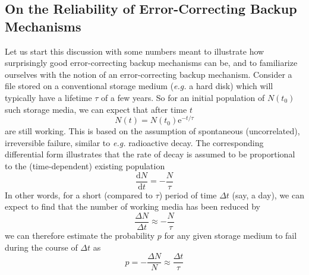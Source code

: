 \documentclass[11pt]{article}
\begin{document}
\begin{mainmatter}
\subsection{On the Reliability of Error-Correcting Backup Mechanisms}

Let us start this discussion with some numbers meant to illustrate how surprisingly good error-correcting backup mechanisms can be, and to familiarize ourselves with the notion of an error-correcting backup mechanism. Consider a file stored on a conventional storage medium (\emph{e.g.} a hard disk) which will typically have a lifetime $\tau$ of a few years. So for an initial population of $N(t_0)$ such storage media, we can expect that after time $t$
\begin{equation}
N(t) = N(t_0) \mathrm e^{-t / \tau}
\end{equation}
are still working. This is based on the assumption of spontaneous (uncorrelated), irreversible failure, similar to \emph{e.g.} radioactive decay. The corresponding differential form illustrates that the rate of decay is assumed to be proportional to the (time-dependent) existing population
\begin{equation}
\frac{\mathrm d N}{\mathrm d t} = -\frac{N}{\tau}
\end{equation}
In other words, for a short (compared to $\tau$) period of time $\Delta t$ (say, a day), we can expect to find that the number of working media has been reduced by
\begin{equation}
\frac{\Delta N}{\Delta t} \approx -\frac{N}{\tau}
\end{equation}
we can therefore estimate the probability $p$ for any given storage medium to fail during the course of $\Delta t$ as
\begin{equation}
p = -\frac{\Delta N}{N} \approx \frac{\Delta t}{\tau}
\label{destroySmall}
\end{equation}


\end{mainmatter}
\end{document}
